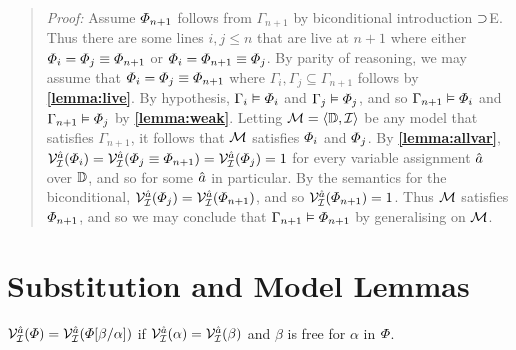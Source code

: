 \label{rule:BiconE}

\begin{quote} 
  \textit{Proof:} Assume $\varPhi_{n+1}$ follows from $\Gamma_{n+1}$ by biconditional introduction $\supset$E.
Thus there are some lines $i,j\leq n$ that are live at $n+1$ where either $\varPhi_i=\varPhi_j\equiv\varPhi_{n+1}$ or $\varPhi_i=\varPhi_{n+1}\equiv\varPhi_j$.
  By parity of reasoning, we may assume that $\varPhi_i=\varPhi_j\equiv\varPhi_{n+1}$ where $\Gamma_i,\Gamma_j\subseteq\Gamma_{n+1}$ follows by \textbf{\ref{lemma:live}}.
  By hypothesis, $\Gamma_i\vDash \varPhi_i$ and $\Gamma_j\vDash \varPhi_j$, and so $\Gamma_{n+1} \vDash \varPhi_i$ and $\Gamma_{n+1} \vDash \varPhi_j$ by \textbf{\ref{lemma:weak}}.
  Letting $\mathcal{M}=\langle\mathbb{D},\mathcal{I}\rangle$ be any model that satisfies $\Gamma_{n+1}$, it follows that $\mathcal{M}$ satisfies $\varPhi_i$ and $\varPhi_j$.
  By \textbf{\ref{lemma:allvar}}, $\mathcal{V}_{\mathcal{I}}^{\hat{a}}(\varPhi_i)=\mathcal{V}_{\mathcal{I}}^{\hat{a}}(\varPhi_j\equiv\varPhi_{n+1})=\mathcal{V}_{\mathcal{I}}^{\hat{a}}(\varPhi_j)=1$ for every variable assignment $\hat{a}$ over $\mathbb{D}$, and so for some $\hat{a}$ in particular. 
  By the semantics for the biconditional, $\mathcal{V}_{\mathcal{I}}^{\hat{a}}(\varPhi_j)=\mathcal{V}_{\mathcal{I}}^{\hat{a}}(\varPhi_{n+1})$, and so $\mathcal{V}_{\mathcal{I}}^{\hat{a}}(\varPhi_{n+1})=1$.
  Thus $\mathcal{M}$ satisfies $\varPhi_{n+1}$, and so we may conclude that $\Gamma_{n+1} \vDash \varPhi_{n+1}$ by generalising on $\mathcal{M}$.
\end{quote}






\section{Substitution and Model Lemmas}%
  \label{sec:Lemmas}



\begin{Lthm} \label{lemma:sub}
  $\mathcal{V}_{\mathcal{I}}^{\hat{a}}(\varPhi)=\mathcal{V}_{\mathcal{I}}^{\hat{a}}(\varPhi[\beta/\alpha])$ if $\mathcal{V}_{\mathcal{I}}^{\hat{a}}(\alpha)=\mathcal{V}_{\mathcal{I}}^{\hat{a}}(\beta)$ and $\beta$ is free for $\alpha$ in $\varPhi$.
\end{Lthm}

